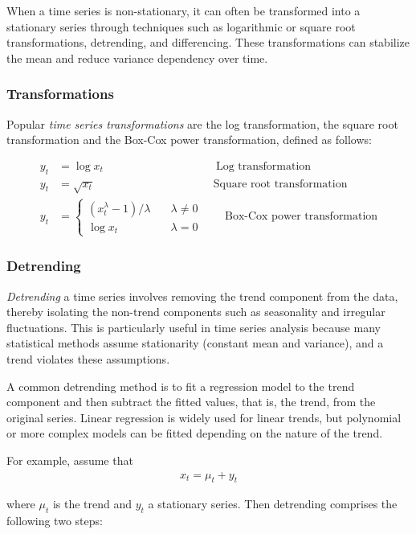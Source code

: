 When a time series is non-stationary, it can often be transformed into a stationary series through techniques such as logarithmic or square root transformations, detrending, and differencing. These transformations can stabilize the mean and reduce variance dependency over time.

\subsubsection*{Transformations}

Popular \emph{time series transformations} are the log transformation, the square root transformation and the Box-Cox power transformation, defined as follows:

\begin{align*}y_t &= \log x_t \qquad \qquad \qquad \qquad \qquad \text{Log transformation}\\
  y_t &= \sqrt{x_t} \qquad \qquad \; \; \qquad \qquad \qquad \text{Square root transformation} \\
  y_t &= \begin{cases}(x_t^\lambda-1)/\lambda &\quad \lambda\neq0 \\
  \log x_t &\quad \lambda=0
  \end{cases} \qquad \text{Box-Cox power transformation}
\end{align*}

\subsubsection*{Detrending}

\emph{Detrending} a time series involves removing the trend component from the data, thereby isolating the non-trend components such as seasonality and irregular fluctuations. This is particularly useful in time series analysis because many statistical methods assume stationarity (constant mean and variance), and a trend violates these assumptions.

A common detrending method is to fit a regression model to the trend component and then subtract the fitted values, that is, the trend, from the original series. Linear regression is widely used for linear trends, but polynomial or more complex models can be fitted depending on the nature of the trend.

For example, assume that 
\begin{align*}
x_t = \mu_t + y_t
\end{align*}

where $\mu_t$ is the trend and $y_t$ a stationary series. Then detrending comprises the following two steps:

